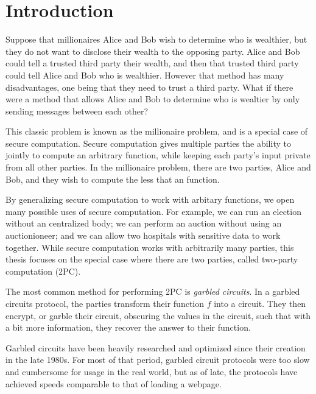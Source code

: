 

\chapter*{Introduction}

Suppose that millionaires Alice and Bob wish to determine who is wealthier, but they do not want to disclose their wealth to the opposing party.
Alice and Bob could tell a trusted third party their wealth, and then that trusted third party could tell Alice and Bob who is wealthier.
However that method has many disadvantages, one being that they need to trust a third party.
What if there were a method that allows Alice and Bob to determine who is wealtier by only sending messages between each other?

This classic problem is known as the millionaire problem, and is a special case of secure computation.
Secure computation gives multiple parties the ability to jointly to compute an arbitrary function, while keeping each party's input private from all other parties.
In the millionaire problem, there are two parties, Alice and Bob, and they wish to compute the less that an function.

By generalizing secure computation to work with arbitary functions, we open many possible uses of secure computation.
For example, we can run an election without an centralized body; we can perform an auction without using an auctionioneer; and we can allow two hospitals with sensitive data to work together.
While secure computation works with arbitrarily many parties, this thesis focuses on the special case where there are two parties, called two-party computation (2PC).

The most common method for performing 2PC is \textit{garbled circuits}.
In a garbled circuits protocol, the parties transform their function $f$ into a circuit. 
They then encrypt, or garble their circuit, obscuring the values in the circuit, such that with a bit more information, they recover the answer to their function.

Garbled circuits have been heavily researched and optimized since their creation in the late 1980s.
For most of that period, garbled circuit protocols were too slow and cumbersome for usage in the real world, but as of late, the protocols have achieved speeds comparable to that of loading a webpage. 

